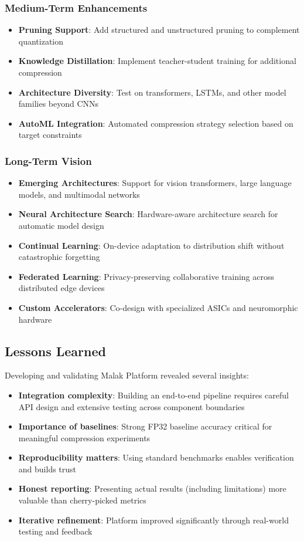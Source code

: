\subsubsection{Medium-Term Enhancements}
\begin{itemize}
\item \textbf{Pruning Support}: Add structured and unstructured pruning to complement quantization
\item \textbf{Knowledge Distillation}: Implement teacher-student training for additional compression
\item \textbf{Architecture Diversity}: Test on transformers, LSTMs, and other model families beyond CNNs
\item \textbf{AutoML Integration}: Automated compression strategy selection based on target constraints
\end{itemize}

\subsubsection{Long-Term Vision}
\begin{itemize}
\item \textbf{Emerging Architectures}: Support for vision transformers, large language models, and multimodal networks
\item \textbf{Neural Architecture Search}: Hardware-aware architecture search for automatic model design
\item \textbf{Continual Learning}: On-device adaptation to distribution shift without catastrophic forgetting
\item \textbf{Federated Learning}: Privacy-preserving collaborative training across distributed edge devices
\item \textbf{Custom Accelerators}: Co-design with specialized ASICs and neuromorphic hardware
\end{itemize}

\subsection{Lessons Learned}

Developing and validating Malak Platform revealed several insights:

\begin{itemize}
\item \textbf{Integration complexity}: Building an end-to-end pipeline requires careful API design and extensive testing across component boundaries
\item \textbf{Importance of baselines}: Strong FP32 baseline accuracy critical for meaningful compression experiments
\item \textbf{Reproducibility matters}: Using standard benchmarks enables verification and builds trust
\item \textbf{Honest reporting}: Presenting actual results (including limitations) more valuable than cherry-picked metrics
\item \textbf{Iterative refinement}: Platform improved significantly through real-world testing and feedback
\end{itemize}

